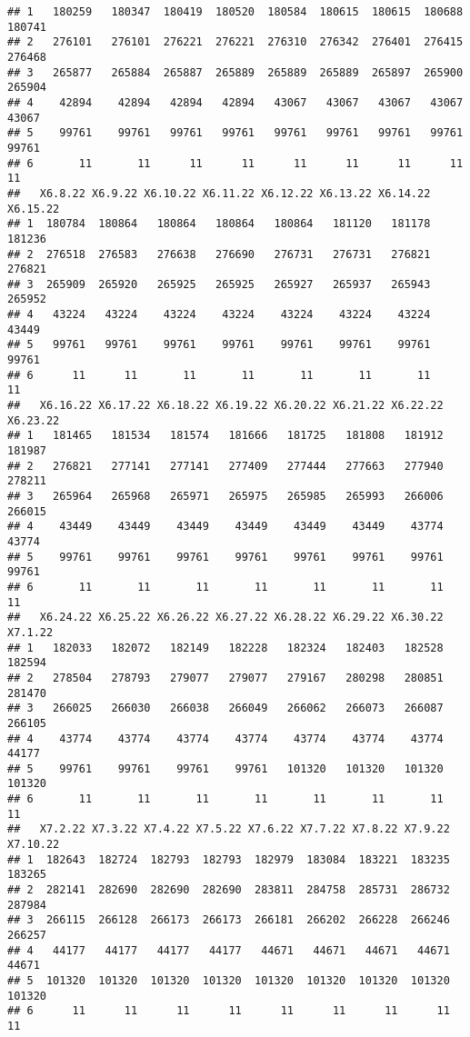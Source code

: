 \documentclass[
]{article}
\begin{document}
\begin{verbatim}
## 1   180259   180347  180419  180520  180584  180615  180615  180688  180741
## 2   276101   276101  276221  276221  276310  276342  276401  276415  276468
## 3   265877   265884  265887  265889  265889  265889  265897  265900  265904
## 4    42894    42894   42894   42894   43067   43067   43067   43067   43067
## 5    99761    99761   99761   99761   99761   99761   99761   99761   99761
## 6       11       11      11      11      11      11      11      11      11
##   X6.8.22 X6.9.22 X6.10.22 X6.11.22 X6.12.22 X6.13.22 X6.14.22 X6.15.22
## 1  180784  180864   180864   180864   180864   181120   181178   181236
## 2  276518  276583   276638   276690   276731   276731   276821   276821
## 3  265909  265920   265925   265925   265927   265937   265943   265952
## 4   43224   43224    43224    43224    43224    43224    43224    43449
## 5   99761   99761    99761    99761    99761    99761    99761    99761
## 6      11      11       11       11       11       11       11       11
##   X6.16.22 X6.17.22 X6.18.22 X6.19.22 X6.20.22 X6.21.22 X6.22.22 X6.23.22
## 1   181465   181534   181574   181666   181725   181808   181912   181987
## 2   276821   277141   277141   277409   277444   277663   277940   278211
## 3   265964   265968   265971   265975   265985   265993   266006   266015
## 4    43449    43449    43449    43449    43449    43449    43774    43774
## 5    99761    99761    99761    99761    99761    99761    99761    99761
## 6       11       11       11       11       11       11       11       11
##   X6.24.22 X6.25.22 X6.26.22 X6.27.22 X6.28.22 X6.29.22 X6.30.22 X7.1.22
## 1   182033   182072   182149   182228   182324   182403   182528  182594
## 2   278504   278793   279077   279077   279167   280298   280851  281470
## 3   266025   266030   266038   266049   266062   266073   266087  266105
## 4    43774    43774    43774    43774    43774    43774    43774   44177
## 5    99761    99761    99761    99761   101320   101320   101320  101320
## 6       11       11       11       11       11       11       11      11
##   X7.2.22 X7.3.22 X7.4.22 X7.5.22 X7.6.22 X7.7.22 X7.8.22 X7.9.22 X7.10.22
## 1  182643  182724  182793  182793  182979  183084  183221  183235   183265
## 2  282141  282690  282690  282690  283811  284758  285731  286732   287984
## 3  266115  266128  266173  266173  266181  266202  266228  266246   266257
## 4   44177   44177   44177   44177   44671   44671   44671   44671    44671
## 5  101320  101320  101320  101320  101320  101320  101320  101320   101320
## 6      11      11      11      11      11      11      11      11       11

\end{verbatim}
\end{document}
